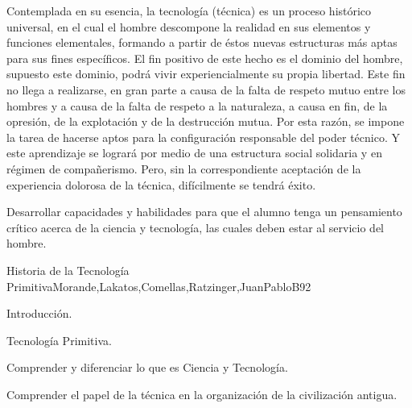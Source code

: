 \begin{syllabus}


\begin{justification}

Contemplada en su esencia, la tecnología (técnica) es un proceso histórico universal, en el cual el hombre descompone la realidad en sus elementos y funciones elementales, formando a partir de éstos nuevas estructuras más aptas para sus fines específicos.
El fin positivo de este hecho es el dominio del hombre,  supuesto este dominio, podrá vivir experiencialmente su propia libertad. Este fin no llega a realizarse, en gran parte a causa de la falta de respeto mutuo entre los hombres y a causa de la falta de respeto a la naturaleza, a causa en fin, de la opresión, de la explotación y de la destrucción mutua.
Por esta razón, se impone la tarea de hacerse aptos para la configuración responsable del poder técnico. Y este aprendizaje se logrará por medio de una estructura social solidaria y en régimen de compañerismo. Pero, sin la correspondiente aceptación de la experiencia dolorosa de la técnica, difícilmente se tendrá éxito.
\end{justification}

\begin{goals}
\item Desarrollar capacidades y habilidades para que el alumno tenga un pensamiento crítico acerca de  la ciencia y tecnología, las cuales deben estar al servicio del hombre.
\end{goals}

\begin{outcomes}
\end{outcomes}

\begin{unit}{Historia de la Tecnología Primitiva}{Morande,Lakatos,Comellas,Ratzinger,JuanPabloB}{9}{2}
\begin{topics}
      \item Introducción.
      \item Tecnología Primitiva.
\end{topics}

\begin{learningoutcomes}
	\item Comprender y diferenciar lo que es Ciencia y Tecnología. 
 	\item Comprender el papel de la técnica en la organización de la civilización antigua.
\end{learningoutcomes}
\end{unit}


\end{syllabus}
